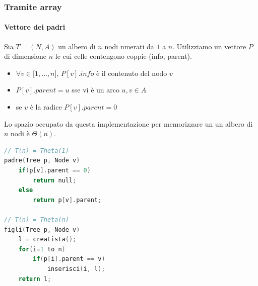 \documentclass[italian]{article}
\begin{document}
\subsubsection{Tramite array}
\paragraph{Vettore dei padri} Sia $T=(N,A)$ un albero di $n$ nodi nmerati da $1$ a $n$. Utilizziamo un vettore $P$ di dimensione $n$ le cui celle contengono coppie (info, parent).
\begin{itemize}[itemsep=0pt]
	\item $\forall v \in \lbrack1,\dots,n\rbrack$,  $P[v].info$ è il contenuto del nodo $v$
	\item $P[v].parent = u $ sse vi è un arco $u,v \in A$
	\item se $v$ è la radice $P[v].parent = 0$
\end{itemize}
Lo spazio occupato da questa implementazione per memorizzare un un albero di $n$ nodi è $\varTheta(n)$.
\begin{lstlisting}[language=c,mathescape=true]
// T(n) = Theta(1)
padre(Tree p, Node v)
	if(p[v].parent == 0)
		return null;
	else
		return p[v].parent;

// T(n) = Theta(n)
figli(Tree p, Node v)
	l = creaLista();
	for(i=1 to n)
		if(p[i].parent == v)
			inserisci(i, l);
	return l;
\end{lstlisting}
\pagebreak
\end{document}
